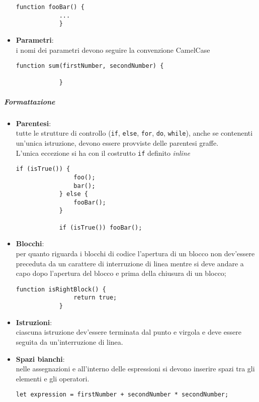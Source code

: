 \begin{itemize}
		\begin{lstlisting}[style=htmlcssjs]
			function fooBar() {
			...
			}
		\end{lstlisting}
	\item \textbf{Parametri}:\\
		i nomi dei parametri devono seguire la convenzione CamelCase \\

		\begin{lstlisting}[style=htmlcssjs]
			function sum(firstNumber, secondNumber) {

			}
		\end{lstlisting}

	\end{itemize}

\subparagraph{Formattazione}

\begin{itemize}
	\item \textbf{Parentesi}:\\
		tutte le strutture di controllo (\texttt{if}, \texttt{else}, \texttt{for}, \texttt{do}, \texttt{while}), anche se contenenti 
		un'unica istruzione, devono essere provviste delle parentesi graffe.\\

		L'unica eccezione si ha con il costrutto \texttt{if} definito \emph{inline}\\

		\begin{lstlisting}[style=htmlcssjs]
			if (isTrue()) {
				foo();
				bar();
			} else {
				fooBar();
			}

			if (isTrue()) fooBar();
		\end{lstlisting}

	\item \textbf{Blocchi}:\\
		per quanto riguarda i blocchi di codice l'apertura di un blocco non dev'essere preceduta da un carattere di interruzione di linea 
		mentre si deve andare a capo dopo l'apertura del blocco e prima della chiusura di un blocco;
		\begin{lstlisting}[style=htmlcssjs]
			function isRightBlock() {
				return true;
			}
		\end{lstlisting}

	\item \textbf{Istruzioni}:\\
		ciascuna istruzione dev'essere terminata dal punto e virgola e deve essere seguita da un'interruzione di linea.

	\item \textbf{Spazi bianchi}:\\
		nelle assegnazioni e all'interno delle espressioni si devono inserire spazi tra gli elementi e gli operatori.
		\begin{lstlisting}[style=htmlcssjs]
			let expression = firstNumber + secondNumber * secondNumber;
		\end{lstlisting}
\end{itemize}

